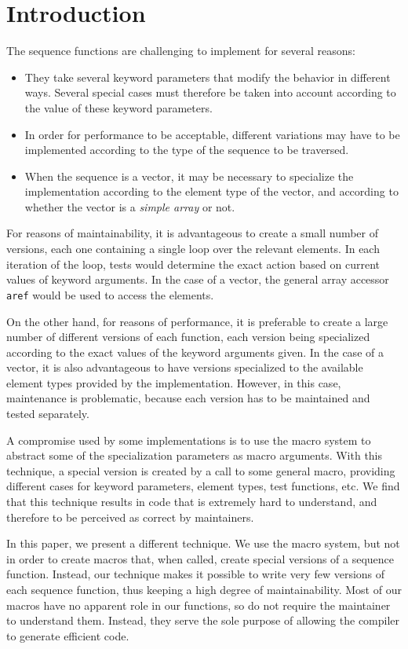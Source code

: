 \section{Introduction}

The \commonlisp{} \cite{ansi:common:lisp} sequence functions are
challenging to implement for several reasons:

\begin{itemize}
\item They take several keyword parameters that modify the behavior in
  different ways.  Several special cases must therefore be taken into
  account according to the value of these keyword parameters.
\item In order for performance to be acceptable, different variations
  may have to be implemented according to the type of the sequence to
  be traversed.
\item When the sequence is a vector, it may be necessary to specialize
  the implementation according to the element type of the vector, and
  according to whether the vector is a \emph{simple array} or not.
\end{itemize}

For reasons of maintainability, it is advantageous to create a small
number of versions, each one containing a single loop over the
relevant elements.  In each iteration of the loop, tests would
determine the exact action based on current values of keyword
arguments.  In the case of a vector, the general array accessor
\texttt{aref} would be used to access the elements.

On the other hand, for reasons of performance, it is preferable to
create a large number of different versions of each function, each
version being specialized according to the exact values of the keyword
arguments given.  In the case of a vector, it is also advantageous to
have versions specialized to the available element types provided by
the implementation.  However, in this case, maintenance is
problematic, because each version has to be maintained and tested
separately.

A compromise used by some implementations is to use the \commonlisp{}
macro system to abstract some of the specialization parameters as
macro arguments.  With this technique, a special version is created by
a call to some general macro, providing different cases for keyword
parameters, element types, test functions, etc.  We find that this
technique results in code that is extremely hard to understand, and
therefore to be perceived as correct by maintainers.

In this paper, we present a different technique.  We use the
\commonlisp{} macro system, but not in order to create macros that,
when called, create special versions of a sequence function.  Instead,
our technique makes it possible to write very few versions of each
sequence function, thus keeping a high degree of maintainability.
Most of our macros have no apparent role in our functions, so do not
require the maintainer to understand them.  Instead, they serve the
sole purpose of allowing the compiler to generate efficient code.
